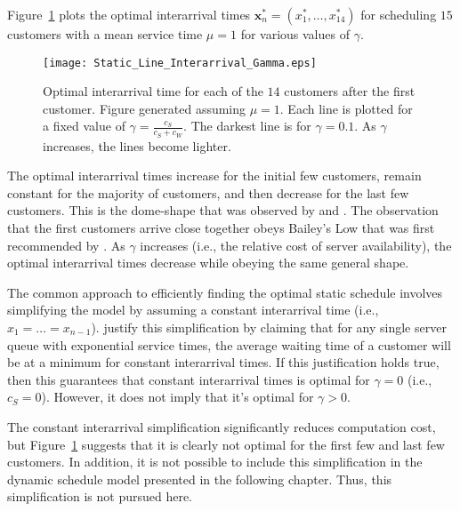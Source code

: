 Figure~\ref{fig:Static_Time_Gamma} plots the optimal interarrival times $\mathbf{x}_{n}^{*} = (x_{1}^{*}, \ldots, x_{14}^{*})$ for scheduling $15$ customers with a mean service time $\mu = 1$ for various values of $\gamma$.
\begin{figure}[htb]
	\centering
	\texttt{[image: Static\_Line\_Interarrival\_Gamma.eps]}
	\caption{Optimal interarrival time for each of the $14$ customers after the first customer. Figure generated assuming $\mu = 1$. Each line is plotted for a fixed value of $\gamma = \frac{c_{S}}{c_{S} + c_{W}}$. The darkest line is for $\gamma = 0.1$. As $\gamma$ increases, the lines become lighter.}
	\label{fig:Static_Time_Gamma}
\end{figure}

The optimal interarrival times increase for the initial few customers, remain constant for the majority of customers, and then decrease for the last few customers. This is the dome-shape that was observed by \citet{Stein} and \citet{Mendel}. The observation that the first customers arrive close together obeys Bailey's Low that was first recommended by \citet{Bailey}. As $\gamma$ increases (i.e., the relative cost of server availability), the optimal interarrival times decrease while obeying the same general shape.

The common approach to efficiently finding the optimal static schedule involves simplifying the model by assuming a constant interarrival time (i.e., $x_{1} = \ldots = x_{n - 1}$). \citet{Stein} justify this simplification by claiming that for any single server queue with exponential service times, the average waiting time of a customer will be at a minimum for constant interarrival times. If this justification holds true, then this guarantees that constant interarrival times is optimal for $\gamma = 0$ (i.e., $c_{S} = 0$). However, it does not imply that it's optimal for $\gamma > 0$.

The constant interarrival simplification significantly reduces computation cost, but Figure~\ref{fig:Static_Time_Gamma} suggests that it is clearly not optimal for the first few and last few customers. In addition, it is not possible to include this simplification in the dynamic schedule model presented in the following chapter. Thus, this simplification is not pursued here.










































